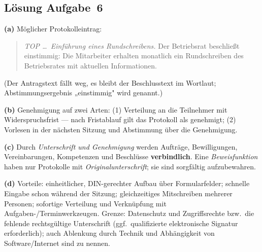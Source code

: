 \documentclass[11pt, a4paper]{article}
\begin{document}
\subsection*{Lösung Aufgabe~6}
\begin{loesung}
\textbf{(a)} Möglicher Protokolleintrag:
\begin{quote}
\emph{TOP \dots\ Einführung eines Rundschreibens.} Der Betriebsrat beschließt einstimmig:
Die Mitarbeiter erhalten monatlich ein Rundschreiben des Betriebsrates mit aktuellen
Informationen.
\end{quote}
(Der Antragstext fällt weg, es bleibt der Beschlusstext im Wortlaut; Abstimmungsergebnis
„einstimmig" wird genannt.)

\textbf{(b)} Genehmigung auf zwei Arten: (1) Verteilung an die Teilnehmer mit
Widerspruchsfrist --- nach Fristablauf gilt das Protokoll als genehmigt; (2) Vorlesen in
der nächsten Sitzung und Abstimmung über die Genehmigung.

\textbf{(c)} Durch \emph{Unterschrift und Genehmigung} werden Aufträge, Bewilligungen,
Vereinbarungen, Kompetenzen und Beschlüsse \textbf{verbindlich}. Eine \emph{Beweisfunktion}
haben nur Protokolle mit \emph{Originalunterschrift}; sie sind sorgfältig aufzubewahren.

\textbf{(d)} Vorteile: einheitlicher, DIN-gerechter Aufbau über Formularfelder; schnelle
Eingabe schon während der Sitzung; gleichzeitiges Mitschreiben mehrerer Personen;
sofortige Verteilung und Verknüpfung mit Aufgaben-/Terminwerkzeugen. Grenze: Datenschutz
und Zugriffsrechte bzw.\ die fehlende rechtsgültige Unterschrift (ggf.\ qualifizierte
elektronische Signatur erforderlich); auch Ablenkung durch Technik und Abhängigkeit von
Software/Internet sind zu nennen.
\end{loesung}
\end{document}
